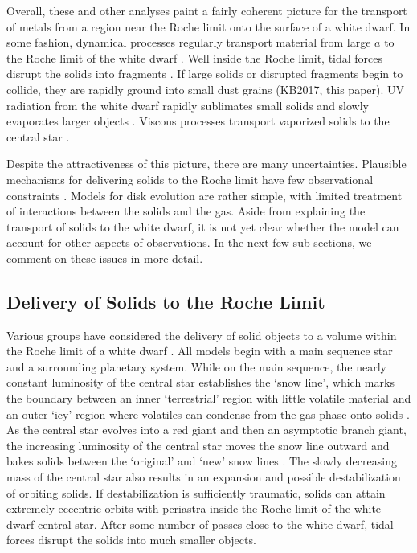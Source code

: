 \documentclass[12pt,preprint]{aastex}
\begin{document}
Overall, these and other analyses paint a fairly coherent picture for the transport of metals 
from a region near the Roche limit onto the surface of a white dwarf. In some fashion, dynamical 
processes regularly transport material from large $a$ to the Roche limit of the white dwarf 
\citep{wyatt2014}.  Well inside the Roche limit, tidal forces disrupt the solids into fragments 
\citep[e.g.,][]{holsapple2006,holsapple2008,debes2012a,bear2013,veras2014a,veras2017,brown2017}. 
If large solids or disrupted fragments begin to collide, they are rapidly ground into small dust 
grains (KB2017, this paper).  UV radiation from the white dwarf rapidly sublimates small solids 
and slowly evaporates larger objects \citep[this paper; see also][]{veras2015d,brown2017}. 
Viscous processes transport vaporized solids to the central star \citep[this paper; see
also][]{metzger2012,bear2013}. 

Despite the attractiveness of this picture, there are many uncertainties. Plausible mechanisms 
for delivering solids to the Roche limit have few observational constraints 
\citep[e.g.,][]{debes2012a,frewen2014,veras2015b,payne2016,hamers2016,antoniadou2016,brown2017}. 
Models for disk evolution are rather simple, with limited treatment of interactions between the
solids and the gas. Aside from explaining the transport of solids to the white dwarf, it is not 
yet clear whether the model can account for other aspects of observations. In the next few
sub-sections, we comment on these issues in more detail.

\subsection{Delivery of Solids to the Roche Limit}
\label{sec: disc-del}

Various groups have considered the delivery of solid objects to a volume within the 
Roche limit of a white dwarf \citep[e.g.,][]{debes2002,veras2014c,veras2015a,bonsor2015,
antoniadou2016,veras2016,payne2017,brown2017,petrovich2017,stephan2017,caiazzo2017}. 
All models begin with
a main sequence star and a surrounding planetary system. While on the main sequence,
the nearly constant luminosity of the central star establishes the `snow line', which 
marks the boundary between an inner `terrestrial' region with little volatile material
and an outer `icy' region where volatiles can condense from the gas phase onto solids
\citep[e.g.,][]{kenn2008a}. 
As the central star evolves into a red giant and then an asymptotic branch giant, the 
increasing luminosity of the central star moves the snow line outward and bakes solids
between the `original' and `new' snow lines \citep{stern1990,parriott1998,villaver2007,
dong2010,bonsor2011,veras2013,mustill2014,malamud2016,malamud2017a,malamud2017b}. 
The slowly decreasing mass of the central star also results in an expansion and possible 
destabilization of orbiting solids. If destabilization is sufficiently traumatic, solids 
can attain extremely eccentric orbits with periastra inside the Roche limit of the white 
dwarf central star. After some number of passes close to the white dwarf, tidal forces 
disrupt the solids into much smaller objects.
\end{document}
